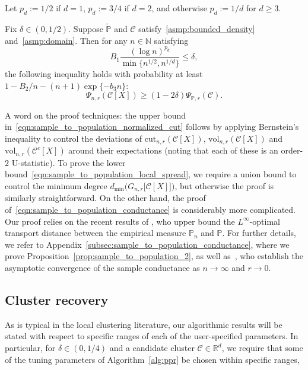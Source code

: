 \documentclass[11pt,twoside]{article}
\newcommand{\Reals}{\mathbb{R}}
\newcommand{\1}{\mathbf{1}}
\newcommand{\Rd}{\Reals^d}
\newcommand{\Leb}{L}
\newcommand{\mc}[1]{\mathcal{#1}}
\newcommand{\Pbb}{\mathbb{P}}
\newcommand{\wt}[1]{\widetilde{#1}}
\newcommand{\vol}{\mathrm{vol}}
\newcommand{\cut}{\mathrm{cut}}
\begin{document}
Let $p_d := 1/2$ if $d = 1$, $p_d := 3/4$ if $d = 2$, and otherwise $p_d := 1/d$ for $d \geq 3$. 
\begin{proposition}
	\label{prop:sample_to_population_2}
	Fix $\delta \in (0,1/2)$. Suppose  $\wt{\Pbb}$ and $\mc{C}$ satisfy~\ref{asmp:bounded_density} and~\ref{asmp:domain}. Then for any $n \in \mathbb{N}$ satisfying
	\begin{equation}
	\label{eqn:sample_to_population_conductance_sample_complexity}
	B_1 \frac{(\log n)^{p_d}}{\min\{n^{1/2},n^{1/d}\}} \leq \delta,
	\end{equation}
	the following inequality holds with probability at least $1 - B_2/n - (n + 1)\exp\{-b_3n\}$:
	\begin{equation}
	\label{eqn:sample_to_population_conductance}
	\Psi_{n,r}(\mc{C}[X]) \geq (1 - 2\delta) \Psi_{\Pbb,r}(\mc{C}).
	\end{equation}
\end{proposition}

A word on the proof techniques: the upper bound in~\eqref{eqn:sample_to_population_normalized_cut} follows by applying Bernstein's inequality to control the deviations of $\cut_{n,r}(\mc{C}[X])$, $\vol_{n,r}(\mc{C}[X])$ and $\vol_{n,r}(\mc{C}^c[X])$ around their expectations (noting that each of these is an order-$2$ U-statistic). To prove the lower bound~\eqref{eqn:sample_to_population_local_spread}, we require a union bound to control the minimum degree $d_{\min}\bigl(G_{n,r}\bigl[\mc{C}[X]\bigr]\bigr)$, but otherwise the proof is similarly straightforward. On the other hand, the proof of~\eqref{eqn:sample_to_population_conductance} is considerably more complicated. Our proof relies on the recent results of \citet{garciatrillos16b}, who upper bound the  $\Leb^{\infty}$-optimal transport distance between the empirical measure $\mathbb{P}_n$ and $\mathbb{P}$. For further details, we refer to Appendix~\ref{subsec:sample_to_population_conductance}, where we prove Proposition~\ref{prop:sample_to_population_2}, as well as~\citet{garciatrillos16}, who establish the asymptotic convergence of the sample conductance as $n \to \infty$ and $r \to 0$.

\subsection{Cluster recovery}
\label{subsec:cluster_recovery}
As is typical in the local clustering literature, our algorithmic results will be stated with respect to specific ranges of each of the user-specified
parameters. In particular, for $\delta \in (0,1/4)$ and a candidate cluster $\mc{C} \in \Rd$, we require that some of the tuning parameters of Algorithm~\ref{alg:ppr} be chosen within specific ranges, 
\end{document}
